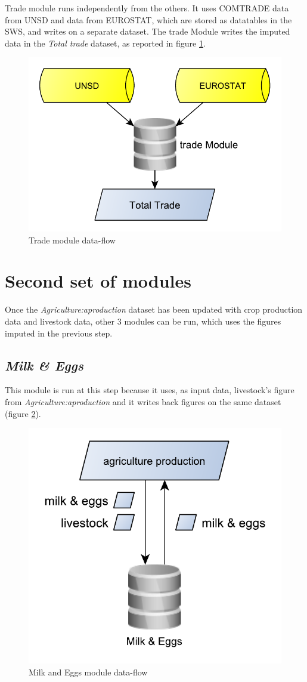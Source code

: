 \documentclass[]{article}
\begin{document}
Trade module runs independently from the others. It uses COMTRADE data
from UNSD and data from EUROSTAT, which are stored as datatables in the
SWS, and writes on a separate dataset. The trade Module writes the
imputed data in the \emph{Total trade} dataset, as reported in figure
\ref{fig:f8}.

\begin{figure}[H]

{\centering \includegraphics[width=0.45\linewidth]{images/SwsFbs/08_trade} 

}

\caption{\label{fig:f8}Trade module data-flow}\label{fig:f8}
\end{figure}

\section{Second set of modules}\label{second-set-of-modules}

Once the \emph{Agriculture:aproduction} dataset has been updated with
crop production data and livestock data, other 3 modules can be run,
which uses the figures imputed in the previous step.

\subsection{\texorpdfstring{\emph{Milk \&
Eggs}}{Milk \& Eggs}}\label{milk-eggs}

This module is run at this step because it uses, as input data,
livestock's figure from \emph{Agriculture:aproduction} and it writes
back figures on the same dataset (figure \ref{fig:f9}).

\begin{figure}[H]

{\centering \includegraphics[width=0.36\linewidth]{images/SwsFbs/09_milkEggs} 

}

\caption{\label{fig:f9}Milk and Eggs module data-flow}\label{fig:f9}
\end{figure}
\end{document}

